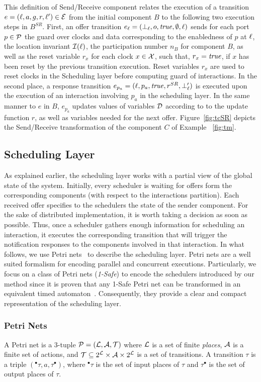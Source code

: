 This definition of Send/Receive component relates the execution of a transition 
$e=(\ell,a,g,r,\ell')\in\mathcal{E}$ from the initial component $B$ to the following two 
execution steps in $B^{SR}$. First, an offer transition $e_{\ell}=(\perp_{\ell},o,\textnormal{\textit{true}},\emptyset,\ell)$
sends for each port $p\in\mathcal{P}$ the guard over clocks and data corresponding to the enabledness
of $p$ at $\ell$, the location invariant $\mathcal{I}(\ell)$, the participation number $n_B$ for
component $B$, as well as the reset variable $r_x$ for each clock $x\in\mathcal{X}$, such that,
$r_x=\textnormal{\textit{true}}$, if $x$ has been reset by the previous transition execution. Reset variables
$r_x$ are used to reset clocks in the Scheduling layer before computing guard of interactions.
In the second place, a response transition $e_{p_a}=(\ell,p_a,\textnormal{\textit{true}},r^{SR},\perp_{\ell}')$  
is executed upon the execution of an interaction involving $p_a$ in the scheduling layer. 
In the same manner to $e$ in $B$, $e_{p_a}$ updates values of variables $\mathcal{D}$ according to
to the update function $r$, as well as variables needed for the next offer. 
Figure~\ref{fig:tcSR} depicts the Send/Receive transformation of the component $C$ of Example
~\ref{fig:tm}.

\subsection{Scheduling Layer}
As explained earlier, the scheduling layer works with a partial view of the global state of 
the system. Initially, every scheduler is waiting for offers form the corresponding components
(with respect to the interactions partition). Each received offer specifies to the schedulers
the state of the sender component. For the sake of distributed implementation, it is
worth taking a decision as soon as possible. Thus, once a scheduler gathers enough information 
for scheduling an interaction, it executes the corresponding transition that will trigger
the notification responses to the components involved in that interaction.
In what follows, we use Petri nets~\cite{} to describe the scheduling layer. 
Petri nets are a well suited formalism for encoding parallel and concurrent executions. 
Particularly, we focus on a class of Petri nets (\emph{1-Safe}) to encode the schedulers
introduced by our method since it is proven that any 1-Safe Petri net can be transformed in
an equivalent timed automaton~\cite{}. 
Consequently, they provide a clear and compact representation 
of the scheduling layer.

\subsubsection{Petri Nets}
\begin{definition}\label{def:pn}
  A Petri net is a 3-tuple $\mathcal{P}=(\mathcal{L},\mathcal{A},\mathcal{T})$ where $\mathcal{L}$ is a set of finite
  \emph{places}, $\mathcal{A}$ is a finite set of actions, and $\mathcal{T}\subseteq 2^{\mathcal{L}}\times
  \mathcal{A}\times 2^{\mathcal{L}}$ is a set of transitions. A transition $\tau$ is a triple 
  $(^\bullet\tau,a, \tau^{\bullet})$, where $^\bullet\tau$ is the set of input places of 
  $\tau$ and $\tau^{\bullet}$ is 
  the set of output places of $\tau$.
\end{definition}

